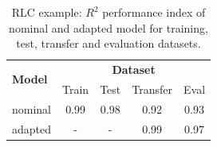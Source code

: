 \documentclass{article}
\begin{document}
\begin{table}[!tb]
\centering
\caption{RLC example: $R^2$  performance index  of  nominal and adapted model for training, test, transfer and evaluation datasets.}
\begin{tabular}{l | c  c  c  c}
\multirow{2}{*}{\textbf{Model}} & \multicolumn{4}{c}{\textbf{Dataset}} \\
                & Train      & Test       & Transfer & Eval       \\ %
\hline
nominal         & 0.99       & 0.98       & 0.92     & 0.93 \\
adapted         & -          & -          & 0.99     & 0.97  \\
\hline
\end{tabular}
\label{tab:RLC_performance}
\end{table}
\end{document}
